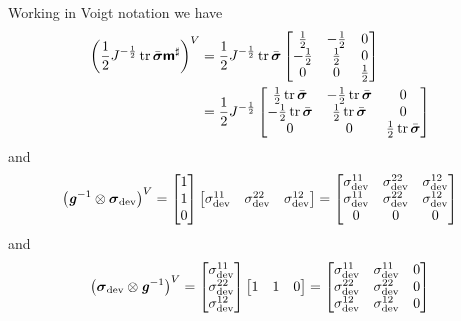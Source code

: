 Working in Voigt notation we have
\begin{equation}
  \begin{split}
    \pbrac{\dfrac{1}{2}J^{-\frac{1}{2}}\trop\bar{\tensortwo{\sigma}}\tensorfour{m}^{\sharp}}^{V}&=\dfrac{1}{2}J^{-\frac{1}{2}}\trop\bar{\tensortwo{\sigma}}\begin{bmatrix}
      \frac{1}{2} & -\frac{1}{2} & 0 \\
      -\frac{1}{2} & \frac{1}{2} & 0 \\
      0 & 0 & \frac{1}{2}
    \end{bmatrix} \\
    &=\dfrac{1}{2}J^{-\frac{1}{2}}\begin{bmatrix}
     \frac{1}{2}\trace{}{\bar{\tensor{\sigma}}} & -\frac{1}{2}\trace{}{\bar{\tensor{\sigma}}} & 0 \\
      -\frac{1}{2}\trace{}{\bar{\tensor{\sigma}}} & \frac{1}{2}\trace{}{\bar{\tensor{\sigma}}} & 0 \\
      0 & 0 & \frac{1}{2}\trace{}{\bar{\tensor{\sigma}}}
    \end{bmatrix} 
  \end{split}
\end{equation}
and
\begin{equation}
  \left(  {\boldsymbol{\mathit{g}}}^{-1} \otimes \boldsymbol{\mathit{\sigma}}_{\operatorname{dev}}  \right)^{V}=\begin{bmatrix}
  1 \\
  1 \\
  0
  \end{bmatrix}\begin{bmatrix}
    \sigma_{\operatorname{dev}}^{11} & \sigma_{\operatorname{dev}}^{22} & \sigma_{\operatorname{dev}}^{12}
  \end{bmatrix}=\begin{bmatrix}
  \sigma_{\operatorname{dev}}^{11} & \sigma_{\operatorname{dev}}^{22} & \sigma_{\operatorname{dev}}^{12} \\
  \sigma_{\operatorname{dev}}^{11} & \sigma_{\operatorname{dev}}^{22} & \sigma_{\operatorname{dev}}^{12} \\
  0 & 0 & 0
  \end{bmatrix}
\end{equation}
and
\begin{equation}
  \left(  \boldsymbol{\mathit{\sigma}}_{\operatorname{dev}} \otimes {\ensuremath{\boldsymbol{\mathit{g}}}}^{-1}  \right)^{V}=\begin{bmatrix}
  \sigma_{\operatorname{dev}}^{11} \\
  \sigma_{\operatorname{dev}}^{22} \\
  \sigma_{\operatorname{dev}}^{12}
  \end{bmatrix}\begin{bmatrix}
  1 & 1 & 0
  \end{bmatrix}=\begin{bmatrix}
  \sigma_{\operatorname{dev}}^{11} & \sigma_{\operatorname{dev}}^{11} & 0 \\
  \sigma_{\operatorname{dev}}^{22} & \sigma_{\operatorname{dev}}^{22} & 0 \\
  \sigma_{\operatorname{dev}}^{12} & \sigma_{\operatorname{dev}}^{12} & 0
  \end{bmatrix}
\end{equation}
